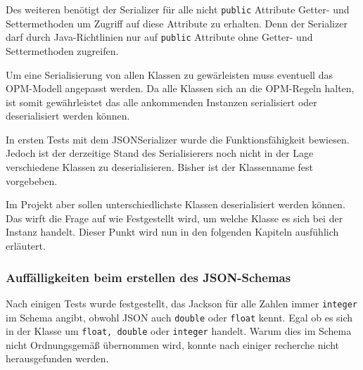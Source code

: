Des weiteren ben\"otigt der Serializer f\"ur alle nicht \texttt{public} Attribute Getter- und Settermethoden um Zugriff auf diese Attribute zu erhalten. Denn der Serializer darf durch Java-Richtlinien nur auf \texttt{public} Attribute ohne Getter- und Settermethoden zugreifen.

Um eine Serialisierung von allen Klassen zu gew\"arleisten muss eventuell das OPM-Modell angepasst werden.
Da alle Klassen sich an die OPM-Regeln halten, ist somit gew\"ahrleistet das alle ankommenden Instanzen serialisiert oder deserialisiert werden k\"onnen.

In ersten Tests mit dem JSONSerializer wurde die Funktionsf\"ahigkeit bewiesen. Jedoch ist der derzeitige Stand des Serialisierers noch nicht in der Lage verschiedene Klassen zu deserialisieren. Bisher ist der Klassenname fest vorgebeben.

Im Projekt aber sollen unterschiedlichste Klassen deserialisiert werden k\"onnen. Das wirft die Frage auf wie Festgestellt wird, um welche Klasse es sich bei der Instanz handelt. Dieser Punkt wird nun in den folgenden Kapiteln ausf\"uhlich erl\"autert.

\subsubsection{Auff\"alligkeiten beim erstellen des JSON-Schemas}
Nach einigen Tests wurde festgestellt, das Jackson f\"ur alle Zahlen immer \texttt{integer} im Schema angibt, obwohl JSON auch \texttt{double} oder \texttt{float} kennt. Egal ob es sich in der Klasse um \texttt{float, double} oder  \texttt{integer} handelt. Warum dies im Schema nicht Ordnungsgem\"a\ss{} \"ubernommen wird, konnte nach einiger recherche nicht herausgefunden werden.